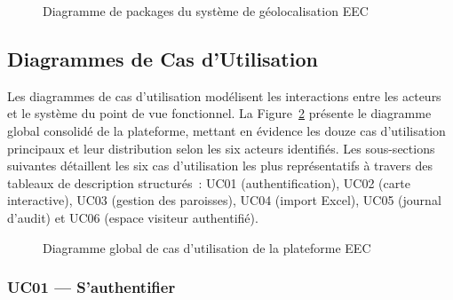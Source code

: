 \documentclass[12pt, a4paper]{report}
\begin{document}
\begin{figure}[H]
  \centering
  \caption{Diagramme de packages du système de géolocalisation EEC}
  \label{fig:diag-packages}
\end{figure}

\subsection{Diagrammes de Cas d'Utilisation}
\label{ssec:uc}

Les diagrammes de cas d'utilisation modélisent les interactions entre les acteurs
et le système du point de vue fonctionnel. La Figure~\ref{fig:diag-uc} présente
le diagramme global consolidé de la plateforme, mettant en évidence les douze
cas d'utilisation principaux et leur distribution selon les six acteurs identifiés.
Les sous-sections suivantes détaillent les six cas d'utilisation les plus
représentatifs à travers des tableaux de description structurés~: UC01
(authentification), UC02 (carte interactive), UC03 (gestion des paroisses),
UC04 (import Excel), UC05 (journal d'audit) et UC06 (espace visiteur
authentifié).

\begin{figure}[H]
  \centering
  \caption{Diagramme global de cas d'utilisation de la plateforme EEC}
  \label{fig:diag-uc}
\end{figure}

\subsubsection{UC01 --- S'authentifier}
\end{document}

